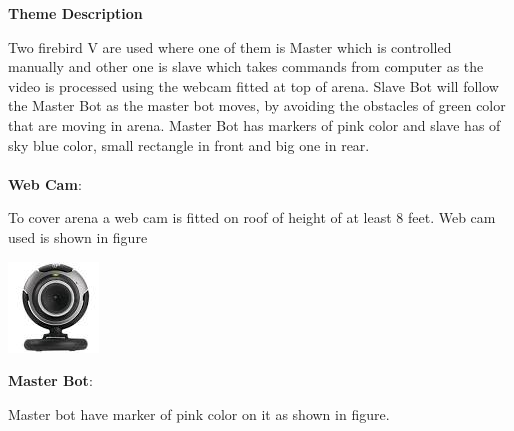 \documentclass[report]{res}
\begin{document}
	\pagebreak
	
	
	\begin{center}
		\textbf{\huge Theme Description} \\
	\end{center}
	
	Two firebird V are used where one of them is Master which is controlled manually and other one is slave which takes commands from computer as the video is processed using the webcam fitted at top of arena. Slave Bot will follow the Master Bot as the master bot moves, by avoiding the obstacles of green color that are moving in arena. Master Bot has markers of pink color and slave has of sky blue color, small rectangle in front and big one in rear.\\ \\
	
	\textbf{\large Web Cam}:
	
	To cover arena a web cam is fitted on roof of height of at least 8 feet. Web cam used is shown in figure
	
	\begin{center}	
	\includegraphics[scale = 1]{graphics/cam.jpg}\\
	\end{center}
	
	\textbf{\large Master Bot}: 
	
	Master bot have marker of pink color on it as shown in figure.\\
	
\end{document}
